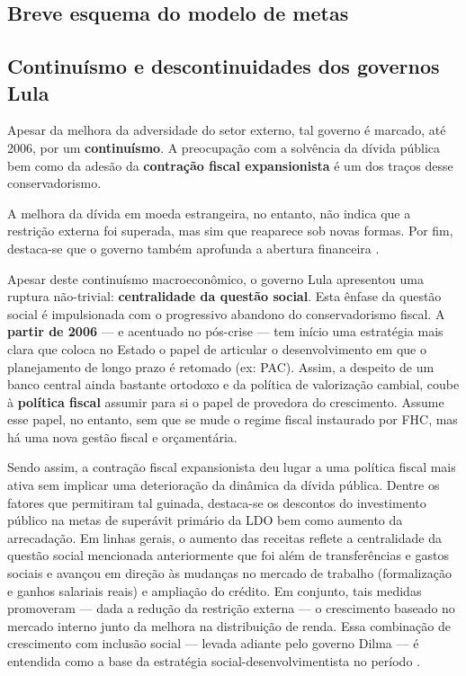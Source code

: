 \documentclass[11pt]{article}
\begin{document}
\subsection*{Breve esquema do modelo de metas}
\label{sec:org9165eca}

\subsection*{Continuísmo e descontinuidades dos governos Lula}
\label{sec:org9695dc3}

Apesar da melhora da adversidade do setor externo, tal governo é marcado, até 2006, por um \textbf{continuísmo}. 
A preocupação com a solvência da dívida pública bem como da adesão da \textbf{contração fiscal expansionista} é um dos traços desse conservadorismo.

A melhora da dívida em moeda estrangeira, no entanto, não indica que a restrição externa foi superada, mas sim que reaparece sob novas formas.
Por fim, destaca-se que o governo também aprofunda a abertura financeira \cite{pratesSECAOIVInsercao}.

Apesar deste continuísmo macroeconômico, o governo Lula apresentou uma ruptura não-trivial: \textbf{centralidade da questão social}.
Esta ênfase da questão social é impulsionada com o progressivo abandono do conservadorismo fiscal.
A \textbf{partir de 2006} ---  e acentuado no pós-crise --- tem início uma estratégia mais clara que coloca no Estado o papel de articular o desenvolvimento em que o planejamento de longo prazo é retomado (ex: PAC).
Assim, a despeito de um banco central ainda bastante ortodoxo e da política de valorização cambial, coube à \textbf{política fiscal} assumir para si o papel de provedora do crescimento.
Assume esse papel, no entanto, sem que se mude o regime fiscal instaurado por FHC, mas há uma nova gestão fiscal e orçamentária.

Sendo assim, a contração fiscal expansionista deu lugar a uma política fiscal mais ativa sem implicar uma deterioração da dinâmica da dívida pública.
Dentre os fatores que permitiram tal guinada, destaca-se os descontos do investimento público na metas de superávit primário da LDO bem como aumento da arrecadação.
Em linhas gerais, o aumento das receitas reflete a centralidade da questão social mencionada anteriormente que foi além de transferências e gastos sociais e avançou em direção às mudanças no mercado de trabalho (formalização e ganhos salariais reais) e ampliação do crédito.
Em conjunto, tais medidas promoveram --- dada a redução da restrição externa --- o crescimento baseado no mercado interno junto da melhora na distribuição de renda.
Essa combinação de crescimento com inclusão social --- levada adiante pelo governo Dilma --- é entendida como a base da estratégia social-desenvolvimentista no período \cite{biancarelliVelhaSenhoraEm2019}. 
\end{document}
